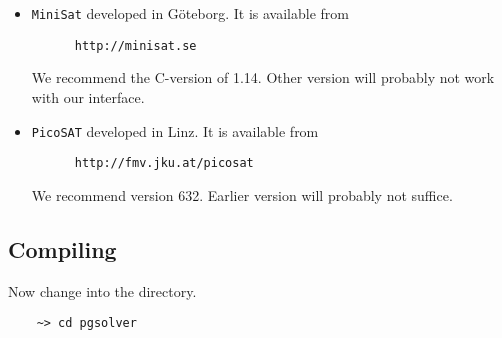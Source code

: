 	\begin{itemize}

        \item \texttt{MiniSat} developed in G\"oteborg. It is available from
        \begin{verbatim}
      http://minisat.se\end{verbatim}
        We recommend the C-version of 1.14. Other version will probably not work with our interface.

        \item \texttt{PicoSAT} developed in Linz. It is available from
        \begin{verbatim}
      http://fmv.jku.at/picosat\end{verbatim}
        We recommend version 632. Earlier version will probably not suffice.

    \end{itemize}



\subsection{Compiling \pgsolver}

Now change into the \pgsolver directory.
\begin{verbatim}
    ~> cd pgsolver
\end{verbatim}

